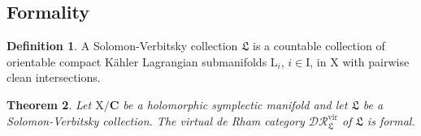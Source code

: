 \documentclass{article}
\theoremstyle{plain}
\newtheorem{theorem}{Theorem}[subsection]   %
\theoremstyle{definition}
\newtheorem{definition}[theorem]{Definition}
\theoremstyle{remark}
\newcommand{\mr}{\mathrm}
\newcommand{\C}{\mathbf C}
\newcommand{\3}{\vspace{3mm}}
\newcommand{\2}{\vspace{2mm}}
\newcommand{\1}{\vspace{1mm}}
\begin{document}
\subsection{Formality}

\begin{definition}A Solomon-Verbitsky collection $\mathfrak{L}$ is a countable collection of orientable compact K\"{a}hler Lagrangian submanifolds $\mr{L}_i$, $i\in \mr{I}$, in $\mr{X}$ with pairwise clean intersections.
\end{definition} 
\2
\begin{theorem}\label{drvir}
Let $\mr{X}/\C$ be a holomorphic symplectic manifold and let $\mathfrak{L}$ be a Solomon-Verbitsky collection. The virtual de Rham category $\mathcal{DR}^{\mr{vir}}_\mathfrak{L}$ of $\mathfrak{L}$ is formal.
\end{theorem}
\end{document}
